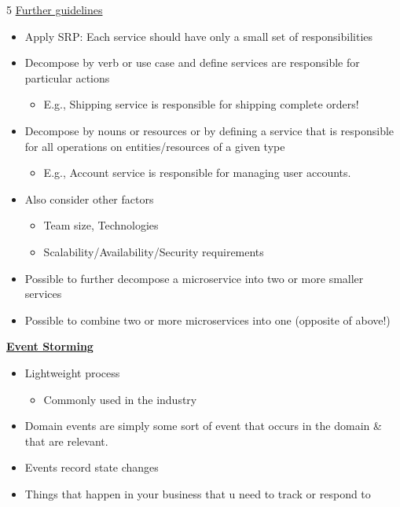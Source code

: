 \documentclass[landscape,a4paper]{extarticle}
\begin{document}
\begin{multicols*}{5}
    \uline{Further guidelines}

    \begin{itemize}
        \item Apply SRP: Each service should have only a small set of responsibilities
        \item Decompose by verb or use case and define services are responsible for particular actions
        \begin{itemize}
            \item E.g., Shipping service is responsible for shipping complete orders!
        \end{itemize}
        \item Decompose by nouns or resources or by defining a service that is responsible
        for all operations on entities/resources of a given type
        \begin{itemize}
            \item E.g., Account service is responsible for managing user accounts.
        \end{itemize}
        \item Also consider other factors
        \begin{itemize}
            \item Team size, Technologies
            \item Scalability/Availability/Security requirements
        \end{itemize}
        \item Possible to further decompose a microservice into two or more smaller services
        \item Possible to combine two or more microservices into one (opposite of above!)
    \end{itemize}

    \textbf{\uline{Event Storming}}

    \begin{itemize}
        \item Lightweight process
        \begin{itemize}
            \item Commonly used in the industry
        \end{itemize}
        \item Domain events are simply some sort of event that occurs in the domain
        \& that are relevant.
        \item Events record state changes
        \item Things that happen in your business that u need to track or respond to
    \end{itemize}


\end{multicols*}
\end{document}
